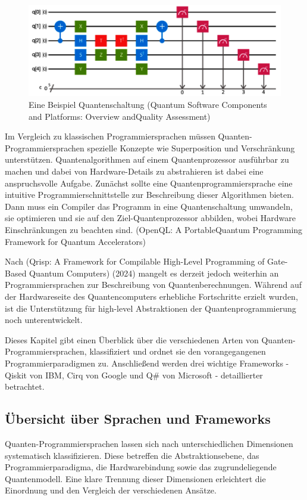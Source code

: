 \begin{figure}[H]
    \centering
    \includegraphics[width=1\linewidth]{images/quantum-programming/Quantum-Circuit-Example.png}
    \caption{Eine Beispiel Quantenschaltung (Quantum Software Components and Platforms: Overview andQuality Assessment)}
    \label{fig:quantum-circuit}
\end{figure}

Im Vergleich zu klassischen Programmiersprachen müssen Quanten-Programmiersprachen spezielle Konzepte wie Superposition und Verschränkung unterstützen. Quantenalgorithmen auf einem Quantenprozessor ausführbar zu machen und dabei von Hardware-Details zu abstrahieren ist dabei eine anspruchsvolle Aufgabe. Zunächst sollte eine Quantenprogrammiersprache eine intuitive Programmierschnittstelle zur Beschreibung dieser Algorithmen bieten.
Dann muss ein Compiler das Programm in eine Quantenschaltung umwandeln, sie optimieren
und sie auf den Ziel-Quantenprozessor abbilden, wobei Hardware
Einschränkungen zu beachten sind. (OpenQL: A PortableQuantum Programming Framework for
Quantum Accelerators)

Nach (Qrisp: A Framework for Compilable High-Level Programming of Gate-Based Quantum Computers) (2024) mangelt es derzeit jedoch weiterhin an Programmiersprachen zur Beschreibung von Quantenberechnungen. Während auf der Hardwareseite des Quantencomputers erhebliche Fortschritte erzielt wurden, ist die Unterstützung für high-level Abstraktionen der Quantenprogrammierung noch unterentwickelt.

Dieses Kapitel gibt einen Überblick über die verschiedenen Arten von Quanten-Programmiersprachen, klassifiziert und ordnet sie den vorangegangenen Programmierparadigmen zu. Anschließend werden drei wichtige Frameworks - Qiskit von IBM, Cirq von Google und Q\# von Microsoft - detaillierter betrachtet.

\subsection{Übersicht über Sprachen und Frameworks}
Quanten-Programmiersprachen lassen sich nach unterschiedlichen Dimensionen systematisch klassifizieren. Diese betreffen die Abstraktionsebene, das Programmierparadigma, die Hardwarebindung sowie das zugrundeliegende Quantenmodell. Eine klare Trennung dieser Dimensionen erleichtert die Einordnung und den Vergleich der verschiedenen Ansätze. 


